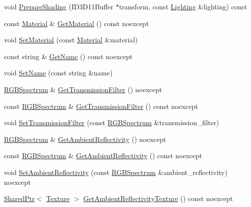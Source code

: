 \begin{DoxyCompactItemize}
\item 
void \hyperlink{structmage_1_1_shaded_material_a53336b2d98e414a73ad64f3176b5e996}{Prepare\+Shading} (I\+D3\+D11\+Buffer $\ast$transform, const \hyperlink{structmage_1_1_lighting}{Lighting} \&lighting) const
\item 
const \hyperlink{structmage_1_1_material}{Material} \& \hyperlink{structmage_1_1_shaded_material_a4de9a6fe5389da19cbe3e5b073622374}{Get\+Material} () const noexcept
\item 
void \hyperlink{structmage_1_1_shaded_material_aca5966123c3267d431539bea500d244b}{Set\+Material} (const \hyperlink{structmage_1_1_material}{Material} \&material)
\item 
const string \& \hyperlink{structmage_1_1_shaded_material_af7be0282cc547159cd733475f63eb982}{Get\+Name} () const noexcept
\item 
void \hyperlink{structmage_1_1_shaded_material_a3f8d05c818362ef37bfcf9a02769d0ff}{Set\+Name} (const string \&name)
\item 
\hyperlink{structmage_1_1_r_g_b_spectrum}{R\+G\+B\+Spectrum} \& \hyperlink{structmage_1_1_shaded_material_a6f7957db6f13954152ffb9b71644fe80}{Get\+Transmission\+Filter} () noexcept
\item 
const \hyperlink{structmage_1_1_r_g_b_spectrum}{R\+G\+B\+Spectrum} \& \hyperlink{structmage_1_1_shaded_material_ac1735260a6d52bacbaea76594f7fbfdb}{Get\+Transmission\+Filter} () const noexcept
\item 
void \hyperlink{structmage_1_1_shaded_material_a8be0968eae5daf3d566ee063925671c6}{Set\+Transmission\+Filter} (const \hyperlink{structmage_1_1_r_g_b_spectrum}{R\+G\+B\+Spectrum} \&transmission\+\_\+filter)
\item 
\hyperlink{structmage_1_1_r_g_b_spectrum}{R\+G\+B\+Spectrum} \& \hyperlink{structmage_1_1_shaded_material_afb2818be33977199ecb93689a76e5622}{Get\+Ambient\+Reflectivity} () noexcept
\item 
const \hyperlink{structmage_1_1_r_g_b_spectrum}{R\+G\+B\+Spectrum} \& \hyperlink{structmage_1_1_shaded_material_a4bb3403853e4d6ee9e443e575b33a755}{Get\+Ambient\+Reflectivity} () const noexcept
\item 
void \hyperlink{structmage_1_1_shaded_material_a542065e25a35759da1c2a8d4ebd81024}{Set\+Ambient\+Reflectivity} (const \hyperlink{structmage_1_1_r_g_b_spectrum}{R\+G\+B\+Spectrum} \&ambient\+\_\+reflectivity) noexcept
\item 
\hyperlink{namespacemage_a1e01ae66713838a7a67d30e44c67703e}{Shared\+Ptr}$<$ \hyperlink{classmage_1_1_texture}{Texture} $>$ \hyperlink{structmage_1_1_shaded_material_a66be8b4fbb028b41483f8a9e044e5023}{Get\+Ambient\+Reflectivity\+Texture} () const noexcept

\end{DoxyCompactItemize}
